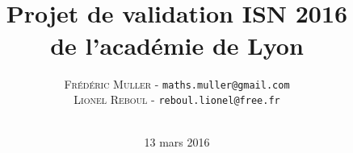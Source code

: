 


\lfoot[\thepage]{}
\rfoot[]{\thepage}




\title{\\ \medskip \medskip \large{Projet de validation ISN 2016\\de l'académie de Lyon}}
\author{\textsc{Frédéric Muller} - \texttt{maths.muller@gmail.com}\\ \textsc{Lionel Reboul} - \texttt{reboul.lionel@free.fr}\\ \\
   }
\date{13 mars 2016}

\maketitle


\clearpage{\pagestyle{empty}\cleardoublepage}
\setcounter{tocdepth}{1}
\tableofcontents
\thispagestyle{fancy}











